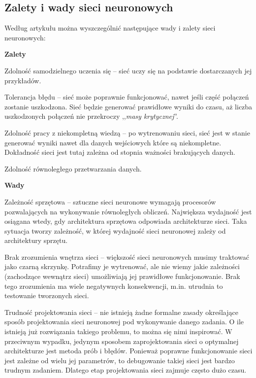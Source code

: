 \subsection{Zalety i wady sieci neuronowych}
Według artykułu \cite{neuralNetworks:wadyZalety} można wyszczególnić następujące wady i zalety sieci neuronowych:

\begin{enumerate*}
\item \textbf{Zalety}
\begin{enumerate*}
\item Zdolność samodzielnego uczenia się -- sieć uczy się na podstawie dostarczanych jej przykładów.
\item Tolerancja błędu -- sieć może poprawnie funkcjonować, nawet jeśli część połączeń zostanie uszkodzona. Sieć będzie generować prawidłowe wyniki do czasu, aż liczba uszkodzonych połączeń nie przekroczy ,,\textit{masy krytycznej}''.
\item Zdolność pracy z niekompletną wiedzą -- po wytrenowaniu sieci, sieć jest w stanie generować wyniki nawet dla danych wejściowych które są niekompletne. Dokładność sieci jest tutaj zależna od stopnia ważności brakujących danych.
\item Zdolność równoległego przetwarzania danych.
\end{enumerate*}
\item \textbf{Wady}
\begin{enumerate*}
\item Zależność sprzętowa -- sztuczne sieci neuronowe wymagają procesorów pozwalających na wykonywanie równoległych obliczeń. Największa wydajność jest osiągana wtedy, gdy architektura sprzętowa odpowiada architekturze sieci. Taka sytuacja tworzy zależność, w której wydajność sieci neuronowej zależy od architektury sprzętu.
\item Brak zrozumienia wnętrza sieci -- większość sieci neuronowych musimy traktować jako czarną skrzynkę. Potrafimy je wytrenować, ale nie wiemy jakie zależności (zachodzące wewnątrz sieci) umożliwiają jej prawidłowe funkcjonowanie. Brak tego zrozumienia ma wiele negatywnych konsekwencji, m.in. utrudnia to testowanie tworzonych sieci.
\item Trudność projektowania sieci -- nie istnieją żadne formalne zasady określające sposób projektowania sieci neuronowej pod wykonywanie danego zadania. O ile istnieją już rozwiązania takiego problemu, to można się nimi inspirować. W przeciwnym wypadku, jedynym sposobem zaprojektowania sieci o optymalnej architekturze jest metoda prób i błędów. Ponieważ poprawne funkcjonowanie sieci jest zależne od wielu jej parametrów, to debugowanie takiej sieci jest bardzo trudnym zadaniem. Dlatego etap projektowania sieci zajmuje często dużo czasu.

\end{enumerate*}
\end{enumerate*}
